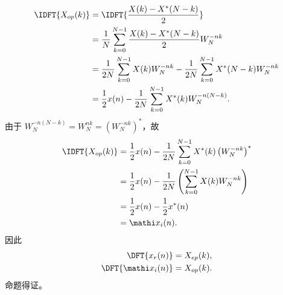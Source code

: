 \begin{solution}
\begin{enumerate}[label=(\arabic*)]
            \begin{align*}
                \IDFT{X_{op}(k)} & = \IDFT{\frac{X(k) - X^*(N - k)}{2}} \\
                & = \frac{1}{N}\sum_{k = 0}^{N - 1}\frac{X(k) - X^*(N - k)}{2}W_N^{-nk} \\
                & = \frac{1}{2N}\sum_{k = 0}^{N - 1}X(k)W_N^{-nk} - \frac{1}{2N}\sum_{k = 0}^{N - 1}X^*(N - k)W_N^{-nk} \\
                & = \frac{1}{2}x(n) - \frac{1}{2N}\sum_{k = 0}^{N - 1}X^*(k)W_N^{-n(N - k)}.
            \end{align*}
            由于 $W_N^{-n(N - k)} = W_N^{nk} = \left(W_N^{-nk}\right)^*$，故
            \begin{align*}
                \IDFT{X_{op}(k)} & = \frac{1}{2}x(n) - \frac{1}{2N}\sum_{k = 0}^{N - 1}X^*(k)\left(W_N^{-nk}\right)^* \\
                & = \frac{1}{2}x(n) - \frac{1}{2N}\left(\sum_{k = 0}^{N - 1}X(k)W_N^{-nk}\right) \\
                & = \frac{1}{2}x(n) - \frac{1}{2}x^*(n) \\
                & = \mathi x_i(n).
            \end{align*}
            因此
            \begin{align*}
                \DFT{x_r(n)} & = X_{ep}(k), \\
                \DFT{\mathi x_i(n)} & = X_{op}(k).
            \end{align*}
            命题得证。
    \end{enumerate}
\end{solution}

